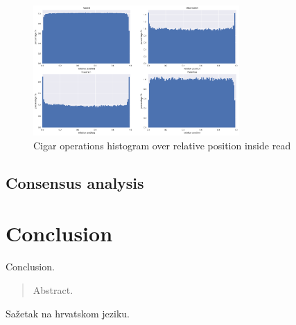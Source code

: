 \documentclass[times, utf8, diplomski, numeric, english]{fer}
\begin{document}
\begin{figure}[!ht]
	\begin{center}
		\includegraphics[width=0.7\textwidth]{./imgs/operation_distributed_r9.png}
		\caption{Cigar operations histogram over relative position inside read}
		\label{fg:cigar_op_dist}
	\end{center}
\end{figure}

\section{Consensus analysis}

\chapter{Conclusion}
Conclusion.





\begin{abstract}
Abstract.

\end{abstract}

\begin{sazetak}
Sažetak na hrvatskom jeziku.

\end{sazetak}
\end{document}
